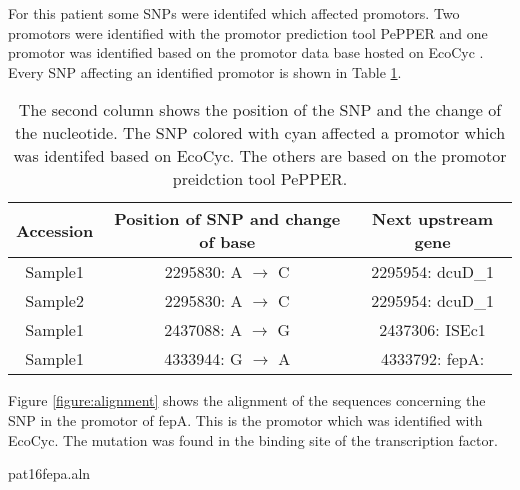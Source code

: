 For this patient some SNPs were identifed which affected promotors. Two promotors were identified with the promotor prediction tool PePPER and one promotor was identified based on the promotor data base hosted on EcoCyc \cite{ecocyc}. Every SNP affecting an identified promotor is shown in Table \ref{table:pat16_snps_promotor}.
\begin{table}[H]
	\begin{tabular}{|c c c|}	
		\hline
		Accession & Position of SNP and change of base & Next upstream gene
		 \\ [0.5ex]
		\hline\hline
		Sample1   & 2295830: A $\rightarrow$ C & 2295954: dcuD\_1				             \\
		\hline
		Sample2   & 2295830: A $\rightarrow$ C & 2295954: dcuD\_1				             \\
		\hline
		Sample1   & 2437088: A $\rightarrow$ G & 2437306: ISEc1 							\\
		\hline
		\rowcolor{LightCyan}
		Sample1   & 4333944: G $\rightarrow$ A & 4333792: fepA: 	\\
		\hline
	\end{tabular}
	\caption{The second column shows the position of the SNP and the change of the nucleotide. The SNP colored with cyan affected a promotor which was identifed based on EcoCyc. The others are based on the promotor preidction tool PePPER.}
	\label{table:pat16_snps_promotor}
\end{table}	
Figure \ref{figure:alignment} shows the alignment of the sequences concerning the SNP in the promotor of fepA. This is the promotor which was identified with EcoCyc. The mutation was found in the binding site of the  transcription factor.  
\begin{texshade}{pat16fepa.aln}
	\hideconsensus
	\label{figure:alignment}
\end{texshade}
